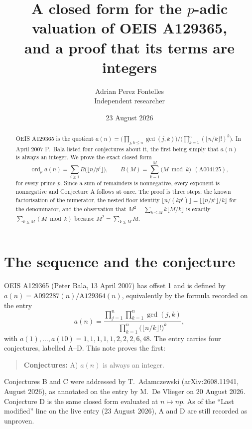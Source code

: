 \documentclass[11pt,a4paper]{article}
\title{A closed form for the $p$-adic valuation of OEIS A129365,\\
and a proof that its terms are integers}
\author{Adrian Perez Fontelles\\ \small Independent researcher}
\date{23 August 2026}
\theoremstyle{plain}
\theoremstyle{definition}
\begin{document}
\maketitle

\begin{abstract}
OEIS A129365 is the quotient
$a(n)=\bigl(\prod_{j,k\le n}\gcd(j,k)\bigr)\big/\bigl(\prod_{k=1}^{n}(\lfloor
n/k\rfloor!)^{k}\bigr)$. In April 2007 P.~Bala listed four conjectures about it, the first
being simply that $a(n)$ is always an integer. We prove the exact closed form
\[
  \operatorname{ord}_{p}a(n)=\sum_{i\ge1}B\bigl(\lfloor n/p^{i}\rfloor\bigr),
  \qquad B(M)=\sum_{k=1}^{M}\bigl(M\bmod k\bigr)\ \ (\text{A004125}),
\]
for every prime $p$. Since a sum of remainders is nonnegative, every exponent is
nonnegative and Conjecture A follows at once. The proof is three steps: the known
factorisation of the numerator, the nested-floor identity
$\lfloor n/(kp^{i})\rfloor=\lfloor\lfloor n/p^{i}\rfloor/k\rfloor$ for the denominator, and
the observation that $M^{2}-\sum_{k\le M}k\lfloor M/k\rfloor$ is exactly
$\sum_{k\le M}(M\bmod k)$ because $M^{2}=\sum_{k\le M}M$.
\end{abstract}

\section{The sequence and the conjecture}

OEIS A129365 (Peter Bala, 13 April 2007) has offset 1 and is defined by
$a(n)=\mathrm{A092287}(n)/\mathrm{A129364}(n)$, equivalently by the formula recorded on the
entry
\begin{equation}\label{eq:def}
  a(n)=\frac{\displaystyle\prod_{j=1}^{n}\prod_{k=1}^{n}\gcd(j,k)}
            {\displaystyle\prod_{k=1}^{n}\bigl(\lfloor n/k\rfloor!\bigr)^{k}},
\end{equation}
with $a(1),\dots,a(10)=1,1,1,1,1,2,2,2,6,48$. The entry carries four conjectures, labelled
A--D. This note proves the first:

\begin{quote}
\textbf{Conjectures:} A) $a(n)$ is always an integer.
\end{quote}

Conjectures B and C were addressed by T.~Adamczewski (arXiv:2608.11941, August 2026), as
annotated on the entry by M.~De Vlieger on 20 August 2026. Conjecture D is the same closed
form evaluated at $n\mapsto np$. As of the ``Last modified'' line on the live entry
(23 August 2026), A and D are still recorded as unproven.
\end{document}
